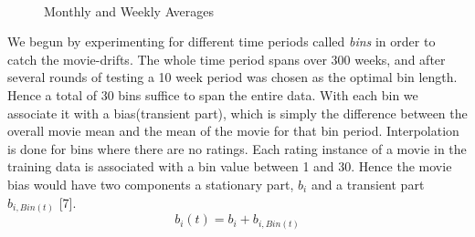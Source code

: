 \begin{figure}[h!]
\\

\label{fig:MonthlyWeeklyAverages}
\caption{Monthly and Weekly Averages}
\end{figure}

We begun by experimenting for different time periods called \emph{bins} in order
to catch the movie-drifts.  The whole time period spans over 300 weeks, and
after several rounds of testing a 10 week period was chosen as the optimal bin
length. Hence a total of 30 bins suffice to span the entire data. With each bin
we associate it with a bias(transient part), which is simply the difference
between the overall movie mean and the mean of the movie for that bin period.
Interpolation is done for bins where there are no ratings. Each rating instance
of a movie in the training data is associated with a bin value between 1 and 30.
Hence the movie bias would have two components a stationary part, $b_{i}$ and a
transient part $b_{i,Bin(t)}$ \refname{[7]}. \\

\begin{equation} 
 b_{i}(t)=b_{i}+b_{i,Bin(t)}
\end{equation}

